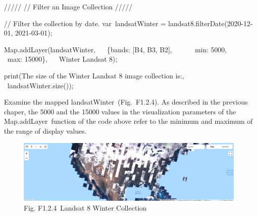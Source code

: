 \documentclass[
  letterpaper,
  DIV=11,
  numbers=noendperiod]{scrreprt}
\newenvironment{Shaded}{\begin{snugshade}}{\end{snugshade}}
\newcommand{\BuiltInTok}[1]{\textcolor[rgb]{0.00,0.23,0.31}{#1}}
\newcommand{\CommentTok}[1]{\textcolor[rgb]{0.37,0.37,0.37}{#1}}
\newcommand{\DataTypeTok}[1]{\textcolor[rgb]{0.68,0.00,0.00}{#1}}
\newcommand{\DecValTok}[1]{\textcolor[rgb]{0.68,0.00,0.00}{#1}}
\newcommand{\FunctionTok}[1]{\textcolor[rgb]{0.28,0.35,0.67}{#1}}
\newcommand{\NormalTok}[1]{\textcolor[rgb]{0.00,0.23,0.31}{#1}}
\newcommand{\OperatorTok}[1]{\textcolor[rgb]{0.37,0.37,0.37}{#1}}
\newcommand{\StringTok}[1]{\textcolor[rgb]{0.13,0.47,0.30}{#1}}
\begin{document}
\begin{Shaded}
\begin{Highlighting}[]
\CommentTok{/////  }
\CommentTok{// Filter an Image Collection  }
\CommentTok{/////  }
  
\CommentTok{// Filter the collection by date.  }
\NormalTok{var landsatWinter }\OperatorTok{=}\NormalTok{ landsat8}\OperatorTok{.}\FunctionTok{filterDate}\NormalTok{(}\StringTok{\textquotesingle{}2020{-}12{-}01\textquotesingle{}}\OperatorTok{,} \StringTok{\textquotesingle{}2021{-}03{-}01\textquotesingle{}}\NormalTok{)}\OperatorTok{;}  
  
\BuiltInTok{Map}\OperatorTok{.}\FunctionTok{addLayer}\NormalTok{(landsatWinter}\OperatorTok{,}  
\NormalTok{   \{}\DataTypeTok{bands}\OperatorTok{:}\NormalTok{ [}\StringTok{\textquotesingle{}B4\textquotesingle{}}\OperatorTok{,} \StringTok{\textquotesingle{}B3\textquotesingle{}}\OperatorTok{,} \StringTok{\textquotesingle{}B2\textquotesingle{}}\NormalTok{]}\OperatorTok{,}  
      \DataTypeTok{ min}\OperatorTok{:} \DecValTok{5000}\OperatorTok{,}  
      \DataTypeTok{ max}\OperatorTok{:} \DecValTok{15000}\NormalTok{\}}\OperatorTok{,}   
    \StringTok{\textquotesingle{}Winter Landsat 8\textquotesingle{}}\NormalTok{)}\OperatorTok{;}  
  
\FunctionTok{print}\NormalTok{(}\StringTok{\textquotesingle{}The size of the Winter Landsat 8 image collection is:\textquotesingle{}}\OperatorTok{,}  
\NormalTok{   landsatWinter}\OperatorTok{.}\FunctionTok{size}\NormalTok{())}\OperatorTok{;}
\end{Highlighting}
\end{Shaded}

Examine the mapped landsatWinter~(Fig.~F1.2.4). As described in the
previous chaper, the 5000 and the 15000 values in the visualization
parameters of the Map.addLayer~function of the code above refer to the
minimum and maximum of the range of display values.

\begin{figure}

{\centering \includegraphics{./F1/image38.png}

}

\caption{Fig. F1.2.4~Landsat 8 Winter Collection}

\end{figure}
\end{document}
